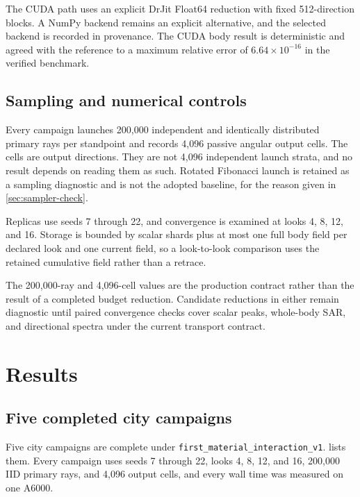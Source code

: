 The CUDA path uses an explicit DrJit Float64 reduction with fixed
512-direction blocks. A NumPy backend remains an explicit alternative, and the
selected backend is recorded in provenance. The CUDA body result is
deterministic and agreed with the reference to a maximum relative error of
$6.64\times10^{-16}$ in the verified benchmark.

\subsection{Sampling and numerical controls}
\label{sec:sampling}

Every campaign launches 200,000 independent and identically distributed primary
rays per standpoint and records 4,096 passive angular output cells. The cells
are output directions. They are not 4,096 independent launch strata, and no
result depends on reading them as such. Rotated Fibonacci launch is retained as
a sampling diagnostic and is not the adopted baseline, for the reason given in
\cref{sec:sampler-check}.

Replicas use seeds 7 through 22, and convergence is examined at looks 4, 8, 12,
and 16. Storage is bounded by scalar shards plus at most one full body field
per declared look and one current field, so a look-to-look comparison uses the
retained cumulative field rather than a retrace.

The 200,000-ray and 4,096-cell values are the production contract rather than
the result of a completed budget reduction. Candidate reductions in either
remain diagnostic until paired convergence checks cover scalar peaks,
whole-body SAR, and directional spectra under the current transport contract.

\section{Results}
\label{sec:roofline-results}

\subsection{Five completed city campaigns}
\label{sec:five-cities}

Five city campaigns are complete under
\texttt{first\_material\_interaction\_v1}.  lists them.
Every campaign uses seeds 7 through 22, looks 4, 8, 12, and 16, 200,000 IID
primary rays, and 4,096 output cells, and every wall time was measured on one
A6000.

